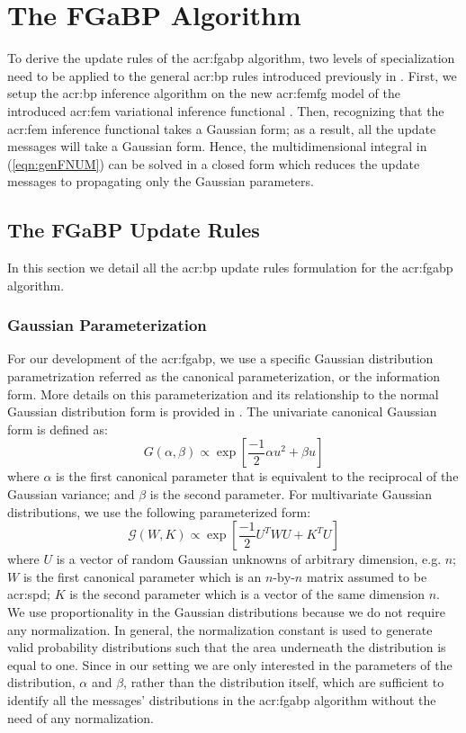 \section{The FGaBP Algorithm}
\label{sec:femgabp}

To derive the update rules of the \gls{acr:fgabp} algorithm, two levels of specialization need to be applied to the general \gls{acr:bp} rules introduced previously in .
First, we setup the \gls{acr:bp} inference algorithm on the new \gls{acr:femfg} model of the introduced \gls{acr:fem} variational inference functional .
Then, recognizing that the \gls{acr:fem} inference functional  takes a Gaussian form; as a result, all the update messages will take a Gaussian form.
Hence, the multidimensional integral in (\ref{eqn:genFNUM}) can be solved in a closed form which reduces the update messages to propagating only the Gaussian parameters.


\subsection{The FGaBP Update Rules}

In this section we detail all the \gls{acr:bp} update rules formulation for the \gls{acr:fgabp} algorithm.


\subsubsection{Gaussian Parameterization}

For our development of the \gls{acr:fgabp}, we use a specific Gaussian distribution parametrization referred as the canonical parameterization, or the information form.
More details on this parameterization and its relationship to the normal Gaussian distribution form is provided in .
The univariate canonical Gaussian form is defined as:
\begin{equation}
	G(\alpha,\beta)\propto\exp\left[\frac{-1}{2}\alpha u^2+\beta u\right]
\end{equation}
where $\alpha$ is the first canonical parameter that is equivalent to the reciprocal of the Gaussian variance; and $\beta$ is the second parameter.
For multivariate Gaussian distributions, we use the following parameterized form:
\begin{equation}
	\mathcal{G}(W,K)\propto\exp\left[\frac{-1}{2}U^TWU+K^T U\right]
\end{equation}
where $U$ is a vector of random Gaussian unknowns of arbitrary dimension, e.g. $n$; $W$ is the first canonical parameter which is an $n\text{-by-}n$ matrix assumed to be \gls{acr:spd}; $K$ is the second parameter which is a vector of the same dimension $n$.
We use proportionality in the Gaussian distributions because we do not require any normalization.
In general, the normalization constant is used to generate valid probability distributions such that the area underneath the distribution is equal to one.
Since in our setting we are only interested in the parameters of the distribution, $\alpha$ and $\beta$, rather than the distribution itself, which are sufficient to identify all the messages' distributions in the \gls{acr:fgabp} algorithm without the need of any normalization.


